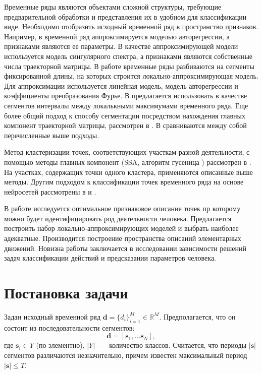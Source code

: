 \documentclass[12pt, twoside]{article}
\begin{document}
Временные ряды являются объектами сложной структуры, требующие предварительной обработки и представления их в удобном для классификации виде. Необходимо отобразить исходный временной ряд в пространство признаков. Например, в \cite{Ivkin15} временной ряд аппроксимируется моделью авторегрессии, а признаками являются ее параметры. В качестве аппроксимирующей модели используется модель сингулярного спектра, а признаками являются собственные числа траекторной матрицы. В работе \cite{Karasikov16} временные ряды разбиваются на сегменты фиксированной длины, на которых строится локально-аппроксимирующая модель. Для аппроксимации используется линейная модель, модель авторегрессии и коэффициенты преобразования Фурье. В \cite{Anikeev18} предлагается использовать в качестве сегментов интервалы между локалькными максимумами временного ряда. Еще более общий подход к способу сегментации посредством нахождения главных компонент траекторной матрицы, рассмотрен в \cite{Motrenko16}. В \cite{Bochkarev18} сравниваются между собой перечисленные выше подходы.

Метод кластеризации точек, соответствующих участкам разной деятельности, с помощью методы главных компонент (SSA, алгоритм гусеница \cite{Danilov97}) рассмотрен в \cite{Grabovoy20}. На участках, содержащих точки одного кластера, применяются описанные выше методы. Другим подходом к классификации точек временного ряда на основе нейросетей рассмотрены в \cite{Dafne19} и \cite{Cinar18}.

В работе исследуется оптимальное признаковое описание точек пр которому можно будет идентифицировать род деятельности человека. Предлагается построить набор локально-аппроксимирующих моделей и выбрать наиболее адекватные. Производится построение пространства описаний элементарных движений. Новизна работы заключается в исследовании зависимости решений задач классификации действий и предсказании параметров человека. 

\section{Постановка задачи}

Задан исходный временной ряд $\mathbf{d}=\{d_i\}_{i=1}^M\in \mathds{R}^M$. Предполагается, что он состоит из последовательности сегментов: 
\begin{equation}\label{eq0}
\mathbf{d}=[\mathbf{s}_1, \ldots \mathbf{s}_N],
\end{equation}
 где $\mathbf{s}_i\in Y$ (по элементно), $|Y|$~---~количество классов. Считается, что периоды $|\mathbf{s}|$ сегментов различаются незначительно, причем известен максимальный период $|\mathbf{s}|\leq T$.
\end{document}
